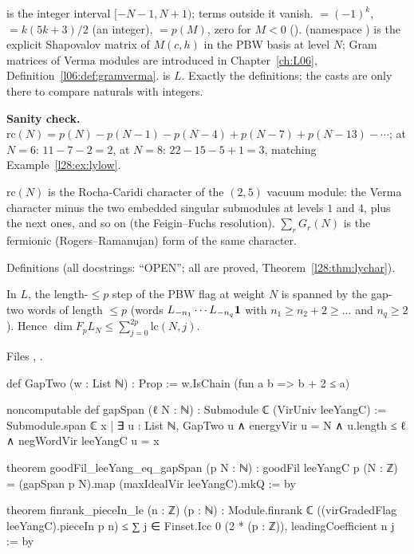 \begin{dictionary}
 is the integer interval $[-N-1,N+1)$; terms outside it vanish. $=(-1)^k$, $=k(5k+3)/2$ (an integer),
$=p(M)$, zero for $M<0$ ().  (namespace ) is the explicit Shapovalov matrix of $M(c,h)$ in the PBW
basis at level $N$; Gram matrices of Verma modules are introduced in Chapter~\ref{ch:L06}, Definition~\ref{l06:def:gramverma}.  is $L$. Exactly the
definitions; the casts  are only there to compare naturals with integers.

\textbf{Sanity check.} $\mathrm{rc}(N)=p(N)-p(N-1)-p(N-4)+p(N-7)+p(N-13)-\cdots$; at $N=6$: $11-7-2=2$, at $N=8$: $22-15-5+1=3$, matching Example~\ref{l28:ex:lylow}.
\end{dictionary}

\begin{physics}
$\mathrm{rc}(N)$ is the Rocha-Caridi character of the $(2,5)$ vacuum module: the Verma character minus the two embedded singular submodules at levels $1$ and $4$,
plus the next ones, and so on (the Feigin--Fuchs resolution). $\sum_rG_r(N)$ is the fermionic (Rogers--Ramanujan) form of the same character.
\end{physics}

\begin{status}
Definitions (all docstrings: ``OPEN''; all are proved, Theorem~\ref{l28:thm:lychar}).
\end{status}

\begin{theorem}\label{l28:thm:gapspan}
In $L$, the length-$\le p$ step of the PBW flag at weight $N$ is spanned by the gap-two words of length $\le p$ (words $L_{-n_1}\cdots L_{-n_q}\mathbf 1$ with
$n_1\ge n_2+2\ge\dots$ and $n_q\ge2$). Hence $\dim F_pL_N\le\sum_{j=0}^{2p}\mathrm{lc}(N,j)$.
\end{theorem}

\noindent Files , .
\begin{leancode}
def GapTwo (w : List ℕ) : Prop := w.IsChain (fun a b => b + 2 ≤ a)

noncomputable def gapSpan (ℓ N : ℕ) : Submodule ℂ (VirUniv leeYangC) :=
  Submodule.span ℂ
    {x | ∃ u : List ℕ, GapTwo u ∧ energyVir u = N ∧ u.length ≤ ℓ ∧ negWordVir leeYangC u = x}

theorem goodFil_leeYang_eq_gapSpan (p N : ℕ) :
    goodFil leeYangC p (N : ℤ) = (gapSpan p N).map (maxIdealVir leeYangC).mkQ := by

theorem finrank_pieceIn_le (n : ℤ) (p : ℕ) :
    Module.finrank ℂ ((virGradedFlag leeYangC).pieceIn p n) ≤
      ∑ j ∈ Finset.Icc 0 (2 * (p : ℤ)), leadingCoefficient n j := by
\end{leancode}

